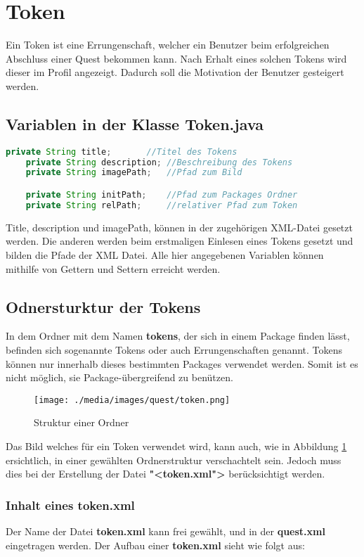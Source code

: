 \section{Token}
Ein Token ist eine Errungenschaft, welcher ein Benutzer beim erfolgreichen Abschluss einer Quest bekommen kann. Nach Erhalt eines solchen Tokens wird dieser im Profil angezeigt. Dadurch soll die Motivation der Benutzer gesteigert werden. 

\subsection{Variablen in der Klasse Token.java}

\begin{lstlisting}[language=JAVA]
	private String title;		//Titel des Tokens
	private String description;	//Beschreibung des Tokens
	private String imagePath;	//Pfad zum Bild

	private String initPath;	//Pfad zum Packages Ordner 
	private String relPath;		//relativer Pfad zum Token
\end{lstlisting}
Title, description und imagePath, können in der zugehörigen XML-Datei gesetzt werden. Die anderen werden beim erstmaligen Einlesen eines Tokens gesetzt und bilden die Pfade der XML Datei. Alle hier angegebenen Variablen können mithilfe von Gettern und Settern erreicht werden.

\subsection{Odnersturktur der Tokens}
In dem Ordner mit dem Namen \textbf{tokens}, der sich in einem Package finden lässt, befinden sich sogenannte Tokens oder auch Errungenschaften genannt. Tokens können nur innerhalb dieses bestimmten Packages verwendet werden. Somit ist es nicht möglich, sie Package-übergreifend zu benützen.
\begin{figure}[h] 
  \centering
     \texttt{[image: ./media/images/quest/token.png]}
  \caption{Struktur einer Ordner}
  \label{fig:struct_token}
\end{figure}

Das Bild welches für ein Token verwendet wird, kann auch, wie in Abbildung \ref{fig:struct_token} ersichtlich, in einer gewählten Ordnerstruktur verschachtelt sein. Jedoch muss dies bei der Erstellung der Datei \textbf{"<token.xml">} berücksichtigt werden.

\subsubsection{Inhalt eines token.xml}
Der Name der Datei \textbf{token.xml} kann frei gewählt, und in der \textbf{quest.xml} eingetragen werden. Der Aufbau einer \textbf{token.xml} sieht wie folgt aus:

